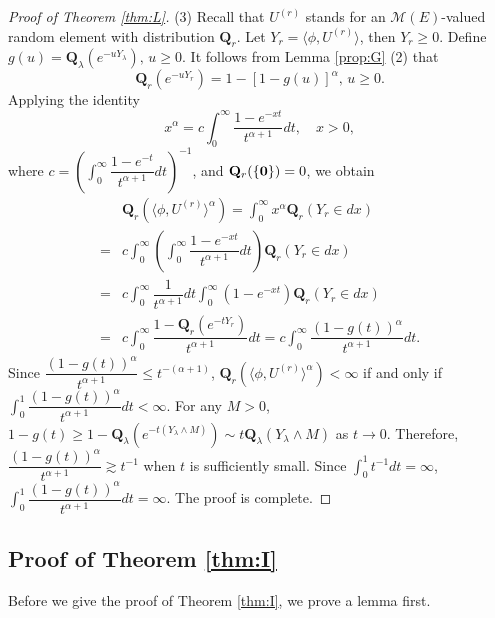 \documentclass[12pt,a4paper]{amsart}
\numberwithin{equation}{section}
\theoremstyle{plain}
\theoremstyle{definition}
\theoremstyle{remark}
\begin{document}
\begin{proof}[Proof of Theorem \ref{thm:L}]
(3)
Recall that $U^{(r)}$ stands for an $\mathcal M(E)$-valued random element with distribution $\mathbf Q_r$. Let $Y_r=\langle\phi, U^{(r)}\rangle$, then $Y_r\geq 0$.
Define $g(u)=\mathbf Q_\lambda\left(e^{-uY_\lambda}\right),\, u\geq 0$.
It follows from Lemma \ref{prop:G} (2) that
$$
\mathbf Q_r\left(e^{-uY_r}\right)=1-[1-g(u)]^\alpha,\, u\geq 0.
$$
Applying the identity
\[
x^\alpha=c\int_0^\infty\dfrac{1-e^{-xt}}{t^{\alpha+1}}dt,
\quad x>0,
\]
where $c=\left(\int_0^\infty\dfrac{1-e^{-t}}{t^{\alpha+1}}dt\right)^{-1}$, and $\mathbf Q_r(\{{\bf 0}\})=0$, we obtain
\begin{align*}
&\mathbf Q_r(\langle\phi, U^{(r)}\rangle^{\alpha})=\int_0^\infty x^\alpha \mathbf Q_r(Y_r\in dx)\\
=&c\int_0^\infty \left(\int_0^\infty\dfrac{1-e^{-xt}}{t^{\alpha+1}}dt \right)\mathbf Q_r(Y_r\in dx)\\
=&c\int_0^\infty\dfrac{1}{t^{\alpha+1}}dt\int_0^\infty\left(1-e^{-xt}\right)\mathbf Q_r(Y_r\in dx)\\
=&c\int_0^\infty\dfrac{1-\mathbf Q_r\left(e^{-tY_r}\right)}{t^{\alpha+1}}dt
=c\int_0^\infty\dfrac{(1-g(t))^\alpha}{t^{\alpha+1}}dt.
\end{align*}
Since $\dfrac{(1-g(t))^\alpha}{t^{\alpha+1}}\leq t^{-(\alpha+1)}$, $\mathbf Q_r(\langle\phi, U^{(r)}\rangle^{\alpha})<\infty$ if and only if $\int_0^1\dfrac{(1-g(t))^\alpha}{t^{\alpha+1}}dt<\infty$.
For any $M>0$, $1-g(t)\geq 1-\mathbf Q_\lambda\left(e^{-t(Y_\lambda\wedge M)}\right)\sim t \mathbf Q_\lambda(Y_\lambda\wedge M)$ as $t\to 0$. Therefore,
$\dfrac{(1-g(t))^\alpha}{t^{\alpha+1}}\gtrsim t^{-1}$ when $t$ is sufficiently small.  Since $\int_0^1 t^{-1}dt=\infty$,
$\int_0^1\dfrac{(1-g(t))^\alpha}{t^{\alpha+1}}dt=\infty$. The proof is complete.
\end{proof}

\subsection{Proof of Theorem \ref{thm:I}}
Before we give the proof  of Theorem \ref{thm:I}, we prove a lemma first.
\end{document}
